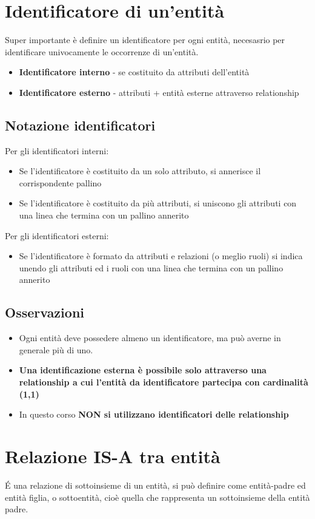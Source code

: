 \section{Identificatore di un'entità}
Super importante è definire un identificatore per ogni entità, necesasrio per identificare
univocamente le occorrenze di un'entità.
\begin{itemize}
    \item \textbf{Identificatore interno} - se costituito da attributi dell'entità
    \item \textbf{Identificatore esterno} - attributi + entità esterne attraverso relationship
\end{itemize}
\subsection*{Notazione identificatori}
Per gli identificatori interni:
\begin{itemize}
    \item Se l'identificatore è costituito da un solo attributo, si annerisce il corrispondente
    pallino
    \item Se l'identificatore è costituito da più attributi, si uniscono gli attributi con
    una linea che termina con un pallino annerito
\end{itemize}
Per gli identificatori esterni:
\begin{itemize}
    \item Se l'identificatore è formato da attributi e relazioni (o meglio ruoli) si
    indica unendo gli attributi ed i ruoli con una linea che termina con un pallino annerito
\end{itemize}
\subsection*{Osservazioni}
\begin{itemize}
    \item Ogni entità deve possedere almeno un identificatore, ma può averne in generale più di uno.
    \item \textbf{Una identificazione esterna è possibile solo attraverso una relationship a
    cui l'entità da identificatore partecipa con cardinalità (1,1)}
    \item In questo corso \textbf{NON si utilizzano identificatori delle relationship}
\end{itemize}
\section{Relazione IS-A tra entità}
\'E una relazione di sottoinsieme di un entità, si può definire come entità-padre
ed entità figlia, o sottoentità, cioè quella che rappresenta un sottoinsieme della
entità padre.
